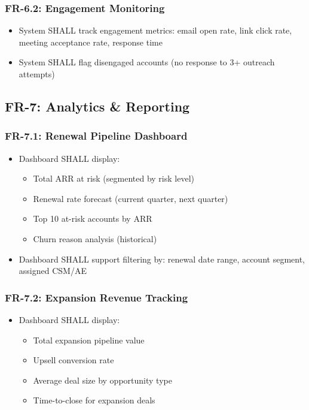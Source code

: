 \documentclass[12pt,a4paper]{article}
\begin{document}
\subsubsection{FR-6.2: Engagement Monitoring}
\begin{itemize}
    \item System SHALL track engagement metrics: email open rate, link click rate, meeting acceptance rate, response time
    \item System SHALL flag disengaged accounts (no response to 3+ outreach attempts)
\end{itemize}

\subsection{FR-7: Analytics \& Reporting}
\subsubsection{FR-7.1: Renewal Pipeline Dashboard}
\begin{itemize}
    \item Dashboard SHALL display:
    \begin{itemize}
        \item Total ARR at risk (segmented by risk level)
        \item Renewal rate forecast (current quarter, next quarter)
        \item Top 10 at-risk accounts by ARR
        \item Churn reason analysis (historical)
    \end{itemize}
    \item Dashboard SHALL support filtering by: renewal date range, account segment, assigned CSM/AE
\end{itemize}
\subsubsection{FR-7.2: Expansion Revenue Tracking}
\begin{itemize}
    \item Dashboard SHALL display:
    \begin{itemize}
        \item Total expansion pipeline value
        \item Upsell conversion rate
        \item Average deal size by opportunity type
        \item Time-to-close for expansion deals
    \end{itemize}
\end{itemize}
\end{document}
